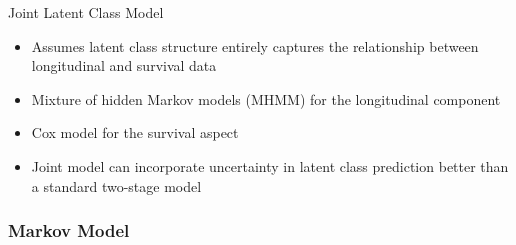 \documentclass{beamer}
\begin{document}
\begin{frame}{Joint Latent Class Model}
\begin{itemize}
    \item Assumes latent class structure entirely captures the relationship between longitudinal and survival data
    \item Mixture of hidden Markov models (MHMM) for the longitudinal component
    \item Cox model for the survival aspect
    \item Joint model can incorporate uncertainty in latent class prediction better than a standard two-stage model
\end{itemize}
\end{frame}




\begin{frame}
\frametitle{Markov Model}

\begin{center}
\end{center}

\end{frame}

\end{document}
